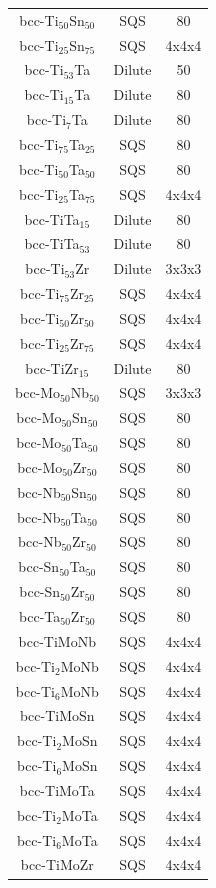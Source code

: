 \begin{longtable}[H]{ c c c }
	bcc-Ti$_{50}$Sn$_{50}$ & SQS & 80\\
	bcc-Ti$_{25}$Sn$_{75}$ & SQS & 4x4x4\\
	bcc-Ti$_{53}$Ta & Dilute & 50\\
	bcc-Ti$_{15}$Ta & Dilute & 80\\
	bcc-Ti$_{7}$Ta & Dilute & 80\\
	bcc-Ti$_{75}$Ta$_{25}$ & SQS & 80\\
	bcc-Ti$_{50}$Ta$_{50}$ & SQS & 80\\
	bcc-Ti$_{25}$Ta$_{75}$ & SQS & 4x4x4\\
	bcc-TiTa$_{15}$ & Dilute & 80\\
	bcc-TiTa$_{53}$ & Dilute & 80\\
	bcc-Ti$_{53}$Zr & Dilute & 3x3x3\\
	bcc-Ti$_{75}$Zr$_{25}$ & SQS & 4x4x4\\
	bcc-Ti$_{50}$Zr$_{50}$ & SQS & 4x4x4\\
	bcc-Ti$_{25}$Zr$_{75}$ & SQS & 4x4x4\\
	bcc-TiZr$_{15}$ & Dilute & 80\\
	bcc-Mo$_{50}$Nb$_{50}$ & SQS & 3x3x3\\
	bcc-Mo$_{50}$Sn$_{50}$ & SQS & 80\\
	bcc-Mo$_{50}$Ta$_{50}$ & SQS & 80\\
	bcc-Mo$_{50}$Zr$_{50}$ & SQS & 80\\
	bcc-Nb$_{50}$Sn$_{50}$ & SQS & 80\\
	bcc-Nb$_{50}$Ta$_{50}$ & SQS & 80\\
	bcc-Nb$_{50}$Zr$_{50}$ & SQS & 80\\
	bcc-Sn$_{50}$Ta$_{50}$ & SQS & 80\\
	bcc-Sn$_{50}$Zr$_{50}$ & SQS & 80\\
	bcc-Ta$_{50}$Zr$_{50}$ & SQS & 80\\
	bcc-TiMoNb & SQS & 4x4x4\\
	bcc-Ti$_{2}$MoNb & SQS & 4x4x4\\
	bcc-Ti$_{6}$MoNb & SQS & 4x4x4\\
	bcc-TiMoSn & SQS & 4x4x4\\
	bcc-Ti$_{2}$MoSn & SQS & 4x4x4\\
	bcc-Ti$_{6}$MoSn & SQS & 4x4x4\\
	bcc-TiMoTa & SQS & 4x4x4\\
	bcc-Ti$_{2}$MoTa & SQS & 4x4x4\\
	bcc-Ti$_{6}$MoTa & SQS & 4x4x4\\
	bcc-TiMoZr & SQS & 4x4x4\\

\end{longtable}
